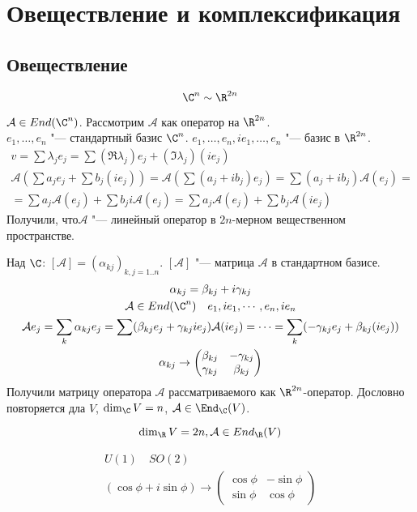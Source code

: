﻿\section{Овеществление и комплексификация}
\subsection{Овеществление}

\[ \C^n \sim \R^{2n} \]

$\mathcal A \in End(\C^n)$.
Рассмотрим $\mathcal A$ как оператор на $\R^{2n}$.\\
$e_1, \dots, e_n$ "--- стандартный базис $\C^n$.
$e_1, \dots, e_n, ie_1, \dots, e_n$ "--- базис в $\R^{2n}$.
\begin{gather*}
	v
	= \sum \lambda_j e_j
	= \sum (\Re \lambda_j) e_j + (\Im \lambda_j) (i e_j) \\
	\mathcal A \left(\sum a_j e_j + \sum b_j(i e_j)\right)
	= \mathcal A \left(\sum(a_j + i b_j)e_j \right)
	= \sum (a_j + ib_j) \mathcal A(e_j) = \\
	= \sum a_j \mathcal A(e_j) + \sum b_j i \mathcal A(e_j)
	= \sum a_j \mathcal A(e_j) + \sum b_j \mathcal A(ie_j)
\end{gather*}
Получили, что$\mathcal A$ "--- линейный оператор в $2n$-мерном вещественном пространстве.

Над $\C$: $[\mathcal A] = (\alpha_{kj})_{k, j = 1..n}$.
$[\mathcal A]$ "--- матрица $\mathcal A$ в стандартном базисе.
\begin{gather*}
	\alpha_{kj} = \beta_{kj} + i \gamma_{kj} \\
	\mathcal A \in End(\C^n) \quad e_1, ie_1, \cdots, e_n, ie_n \\
	\mathcal Ae_j
	= \sum_k \alpha_{kj}e_j
	= \sum (\beta_{kj}e_j + \gamma_{kj}ie_j)
	\mathcal A(ie_j) = \cdots 
	= \sum_k(-\gamma_{kj}e_j + \beta_{kj}(ie_j)) \\
	\alpha_{kj} \to \begin{pmatrix}
		\beta_{kj}  & -\gamma_{kj} \\
		\gamma_{kj} & \beta_{kj}
	\end{pmatrix}
\end{gather*}
Получили матрицу оператора $\mathcal A$ рассматриваемого как $\R^{2n}$-оператор.
Дословно повторяется дла $V$, $\dim_{\C}V = n$, $\mathcal A \in \End_{\C}(V)$.

    $$\dim_{\R}V = 2n, \mathcal A \in End_{\R}(V)$$
\begin{exmp}
\begin{gather*}
	U(1) \quad SO(2) \\
	(\cos\phi + i \sin \phi) \to \begin{pmatrix}
		\cos \phi & -\sin \phi \\
		\sin \phi &  \cos \phi
	\end{pmatrix}
\end{gather*}
\end{exmp}

